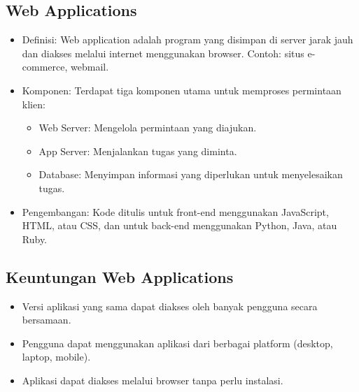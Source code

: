\documentclass{article}
\begin{document}
\subsection{Web Applications}
\begin{itemize}
    \item Definisi: Web application adalah program yang disimpan di server jarak jauh dan diakses melalui internet menggunakan browser. Contoh: situs e-commerce, webmail.
    \item Komponen: Terdapat tiga komponen utama untuk memproses permintaan klien:
          \begin{itemize}
              \item Web Server: Mengelola permintaan yang diajukan.
              \item App Server: Menjalankan tugas yang diminta.
              \item Database: Menyimpan informasi yang diperlukan untuk menyelesaikan tugas.
          \end{itemize}
    \item Pengembangan: Kode ditulis untuk front-end menggunakan JavaScript, HTML, atau CSS, dan untuk back-end menggunakan Python, Java, atau Ruby.
\end{itemize}

\subsection{Keuntungan Web Applications}
\begin{itemize}
    \item Versi aplikasi yang sama dapat diakses oleh banyak pengguna secara bersamaan.
    \item Pengguna dapat menggunakan aplikasi dari berbagai platform (desktop, laptop, mobile).
    \item Aplikasi dapat diakses melalui browser tanpa perlu instalasi.
\end{itemize}
\end{document}
